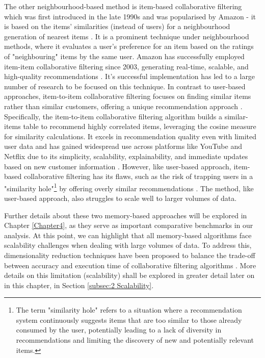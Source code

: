 The other neighbourhood-based method is item-based collaborative filtering which was first introduced in the late 1990s and was popularised by Amazon - it is based on the items’ similarities (instead of users) for a neighbourhood generation of nearest items \cite{sarwar2001item}. It is a prominent technique under neighbourhood methods, where it evaluates a user's preference for an item based on the ratings of "neighbouring" items by the same user. Amazon has successfully employed item-item collaborative filtering since 2003, generating real-time, scalable, and high-quality recommendations \cite{smith2017two}. It’s successful implementation has led to a large number of research to be focused on this technique. In contrast to user-based approaches, item-to-item collaborative filtering focuses on finding similar items rather than similar customers, offering a unique recommendation approach \cite{linden2003amazon}. Specifically, the item-to-item collaborative filtering algorithm builds a similar-items table to recommend highly correlated items, leveraging the cosine measure for similarity calculations. It excels in recommendation quality even with limited user data and has gained widespread use across platforms like YouTube and Netflix due to its simplicity, scalability, explainability, and immediate updates based on new customer information \cite{davidson2010youtube}. However, like user-based approach, item-based collaborative filtering has its flaws, such as the risk of trapping users in a "similarity hole"\footnote{The term "similarity hole" refers to a situation where a recommendation system continuously suggests items that are too similar to those already consumed by the user, potentially leading to a lack of diversity in recommendations and limiting the discovery of new and potentially relevant items.} by offering overly similar recommendations \cite{rashid2002getting}. The method, like user-based approach, also struggles to scale well to larger volumes of data. 

Further details about these two memory-based approaches will be explored in Chapter \ref{Chapter4}, as they serve as important comparative benchmarks in our analysis. At this point, we can highlight that all memory-based algorithms face scalability challenges when dealing with large volumes of data. To address this, dimensionality reduction techniques have been proposed to balance the trade-off between accuracy and execution time of collaborative filtering algorithms \cite{sarwar2000analysis}. More details on this limitation (scalability) shall be explored in greater detail later on in this chapter, in Section \ref{subsec:2 Scalability}.


